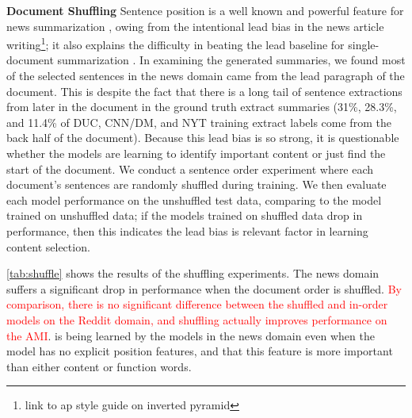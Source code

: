 \textbf{Document Shuffling} Sentence position is a well known and 
powerful feature for news summarization \cite{hong2014improving}, owing 
from the intentional lead bias in the news article writing\footnote{link to ap style guide on inverted pyramid}; it also explains the difficulty in beating
the lead baseline for single-document summarization 
\cite{nenkova2005automatic}.
In examining the generated summaries, we found
most of the selected sentences in the news domain came from the lead paragraph
of the document. This is despite the fact that there is a long tail of 
sentence extractions from later in the document in the ground truth extract 
summaries (31\%, 28.3\%, and 11.4\% of DUC, CNN/DM, and NYT training extract labels come 
from the back half of the document). 
Because this lead bias is so strong, it is questionable whether
the models are learning to identify important content or just find the start
of the document. We conduct a sentence order experiment where 
each document's sentences are randomly shuffled during training. We then
evaluate each model performance on the unshuffled test data, comparing to 
the model trained on unshuffled data; if the models trained on shuffled data
drop in performance, then this indicates the lead bias is relevant factor
in learning content selection.

\autoref{tab:shuffle} shows the results
of the shuffling experiments. 
The news domain suffers a significant drop in performance 
when the document order is shuffled. \textcolor{red}{By comparison, there is no significant difference between the shuffled and in-order models on 
the Reddit domain, and shuffling actually improves performance on the AMI}.
is being learned by the models in the news domain even when the model 
has no explicit position features, and that this feature is more important 
than either content or function words.







